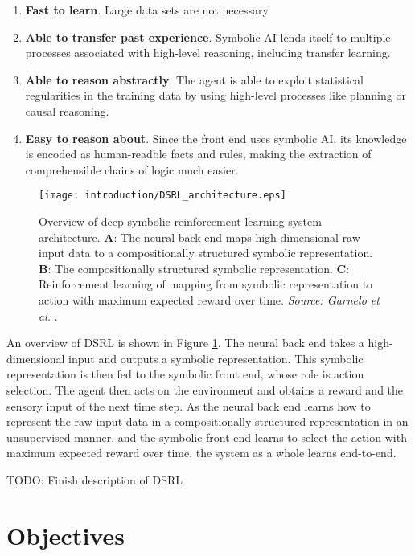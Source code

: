 \begin{enumerate}
\item \textbf{Fast to learn}. Large data sets are not necessary.
\item \textbf{Able to transfer past experience}. Symbolic AI lends itself to multiple processes associated with high-level reasoning, including transfer learning.
\item \textbf{Able to reason abstractly}. The agent is able to exploit statistical regularities in the
training data by using high-level processes like planning or causal reasoning.
\item \textbf{Easy to reason about}. Since the front end uses symbolic AI, its knowledge is encoded as human-readble facts and rules, making the extraction of comprehensible chains of logic much easier.
\end{enumerate}

\begin{figure}[h!]
\centering
\texttt{[image: introduction/DSRL\_architecture.eps]}
\caption{Overview of deep symbolic reinforcement learning system architecture. \textbf{A}: The neural back end maps high-dimensional raw input data to a compositionally structured symbolic representation. \textbf{B}: The compositionally structured symbolic representation. \textbf{C}: Reinforcement learning of mapping from symbolic representation to action with maximum expected reward over time. \textit{Source: Garnelo et al.} \cite{Garnelo2016}.}
\label{fig:dsrl_archiecture}
\end{figure}

An overview of DSRL is shown in Figure \ref{fig:dsrl_archiecture}. The neural back end takes a high-dimensional input and outputs a symbolic representation. This symbolic representation is then fed to the symbolic front end, whose role is action selection. The agent then acts on the environment and obtains a reward and the sensory input of the next time step. As the neural back end learns how to represent the raw input data in a compositionally structured representation in an unsupervised manner, and the symbolic front end learns to select the action with maximum expected reward over time, the system as a whole learns end-to-end.

 TODO: Finish description of DSRL

\section{Objectives}

